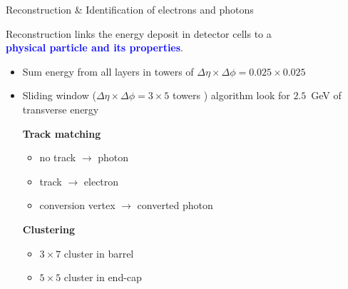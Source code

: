 \begin{frame}{Reconstruction \& Identification of electrons and photons}
  \begin{center}
    Reconstruction links the energy deposit in detector cells to a \\ \textcolor{blue}{\bf physical particle and its properties}.
    \begin{itemize}
      \item Sum energy from all layers in towers of $\Delta\eta\times\Delta\phi =0.025\times 0.025$
      \item Sliding window ($\Delta\eta\times\Delta\phi = 3 \times 5$ towers ) algorithm look for $2.5$~GeV of transverse energy
        \vfill
      \begin{minipage}[t]{0.49\linewidth}
        {\bf Track matching}
        \begin{itemize}
        \item no track $\rightarrow$ photon 
        \item track $\rightarrow$ electron
        \item conversion vertex $\rightarrow$ converted photon
        \end{itemize}
      \end{minipage}
      \hfill
      \begin{minipage}[t]{0.49\linewidth}
        {\bf Clustering}
        \begin{itemize}
        \item $3\times 7$ cluster  in barrel
        \item $5\times 5$ cluster  in end-cap
        \end{itemize}
      \end{minipage}
    \end{itemize}
  \end{center}
\end{frame}


